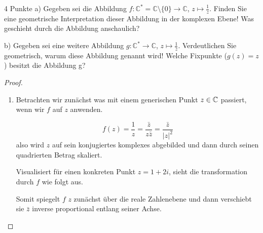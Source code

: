 \documentclass{problemset}
\begin{document}
\begin{problem}[Einheitskreis]{4 Punkte}
a) Gegeben sei die Abbildung $f : \mathbb{C}^* = \mathbb{C} \setminus \{0\} \rightarrow \mathbb{C}$, $z \mapsto \frac{1}{z}$. Finden Sie eine geometrische Interpretation dieser Abbildung in der komplexen Ebene! Was geschieht durch die Abbildung anschaulich?

b) Gegeben sei eine weitere Abbildung $g : \mathbb{C}^* \rightarrow
	\mathbb{C}$, $z \mapsto \frac{1}{\overline{z}}$. Verdeutlichen Sie geometrisch,
warum diese Abbildung  genannt
wird! Welche Fixpunkte ($g(z) = z$) besitzt die Abbildung g?

\begin{proof}
	\leavevmode
	\begin{enumerate}
		\item Betrachten wir zunächst was mit einem generischen Punkt $z \in \mathbb{C}$
		      passiert, wenn wir $f$ auf $z$ anwenden.

		      \[
			      f(z) = \frac{1}{z} = \frac{\bar{z}}{z \bar{z}} = \frac{\bar{z}}{{|z|}^2}
		      \] also wird $z$ auf sein konjugiertes komplexes abgebilded und dann durch seinen
		      quadrierten Betrag skaliert.

		      Visualisiert für einen konkreten Punkt $z = 1 + 2i$, sieht die transformation
		      durch $f$ wie folgt aus.

		      \begin{center}
		      \end{center}

		      Somit spiegelt $f$ $z$ zunächst über die reale Zahlenebene und dann verschiebt
		      sie $\bar{z}$ inverse proportional entlang seiner Achse.


\end{enumerate}
\end{proof}
\end{problem}
\end{document}
